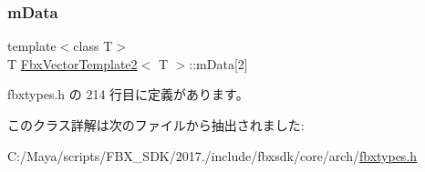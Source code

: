 \subsubsection{\texorpdfstring{m\+Data}{mData}}
{\footnotesize\ttfamily template$<$class T$>$ \\
T \hyperlink{class_fbx_vector_template2}{Fbx\+Vector\+Template2}$<$ T $>$\+::m\+Data\mbox{[}2\mbox{]}}



 fbxtypes.\+h の 214 行目に定義があります。



このクラス詳解は次のファイルから抽出されました\+:\begin{DoxyCompactItemize}
\item 
C\+:/\+Maya/scripts/\+F\+B\+X\+\_\+\+S\+D\+K/2017./include/fbxsdk/core/arch/\hyperlink{fbxtypes_8h}{fbxtypes.\+h}\end{DoxyCompactItemize}
